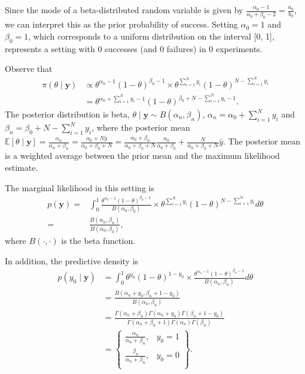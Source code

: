 \begin{enumerate}
Since the mode of a beta-distributed random variable is given by \( \frac{\alpha_0 - 1}{\alpha_0 + \beta_0 - 2} = \frac{a_0}{b_0} \), we can interpret this as the prior probability of success. Setting \( \alpha_0 = 1 \) and \( \beta_0 = 1 \), which corresponds to a uniform distribution on the interval [0, 1], represents a setting with 0 successes (and 0 failures) in 0 experiments. 

Observe that
\begin{align}
	\pi(\theta\mid \bm{y})&\propto \theta^{\alpha_0-1}(1-\theta)^{\beta_0-1} \times \theta^{\sum_{i=1}^N y_i}(1-\theta)^{N-\sum_{i=1}^Ny_i}\nonumber\\
	&= \theta^{\alpha_0+\sum_{i=1}^N y_i-1}(1-\theta)^{\beta_0+N-\sum_{i=1}^Ny_i-1}.\nonumber 
\end{align}
The posterior distribution is beta, $\theta\mid \bm{y}\sim B(\alpha_n,\beta_n)$, $\alpha_n=\alpha_0+\sum_{i=1}^N y_i$ and $\beta_n=\beta_0+N-\sum_{i=1}^Ny_i$, where the posterior mean $\mathbb{E}[\theta\mid \bm{y}]=\frac{\alpha_n}{\alpha_n+\beta_n}=\frac{\alpha_0+N\bar{y}}{\alpha_0+\beta_0+N}=\frac{\alpha_0+\beta_0}{\alpha_0+\beta_0+N}\frac{\alpha_0}{\alpha_0+\beta_0}+\frac{N}{\alpha_0+\beta_0+N}\bar{y}$. The posterior mean is a weighted average between the prior mean and the maximum likelihood estimate.

The marginal likelihood in this setting is
\begin{align}
	p(\bm{y})=&\int_{0}^1 \frac{\theta^{\alpha_0-1}(1-\theta)^{\beta_0-1}}{B(\alpha_0,\beta_0)}\times \theta^{\sum_{i=1}^N y_i}(1-\theta)^{N-\sum_{i=1}^N y_i}d\theta\nonumber\\
	=& \frac{B(\alpha_n,\beta_n)}{B(\alpha_0,\beta_0)},\nonumber
\end{align}
where $B(\cdot ,\cdot)$ is the beta function.

In addition, the predictive density is
\begin{align}
	p(y_0\mid \bm{y})&=\int_0^1 \theta^{y_0}(1-\theta)^{1-y_0}\times \frac{\theta^{\alpha_n-1}(1-\theta)^{\beta_n-1}}{B(\alpha_n,\beta_n)}d\theta\nonumber\\
	&=\frac{B(\alpha_n+y_0,\beta_n+1-y_0)}{B(\alpha_n,\beta_n)}\nonumber\\
	&=\frac{\Gamma(\alpha_n+\beta_n)\Gamma(\alpha_n+y_0)\Gamma(\beta_n+1-y_0)}{\Gamma(\alpha_n+\beta_n+1)\Gamma(\alpha_n)\Gamma(\beta_n)}\nonumber\\
	&=\begin{Bmatrix}
		\frac{\alpha_n}{\alpha_n+\beta_n}, & y_0=1\\
		\frac{\beta_n}{\alpha_n+\beta_n}, & y_0=0\\
	\end{Bmatrix}.\nonumber
\end{align}


\end{enumerate}

